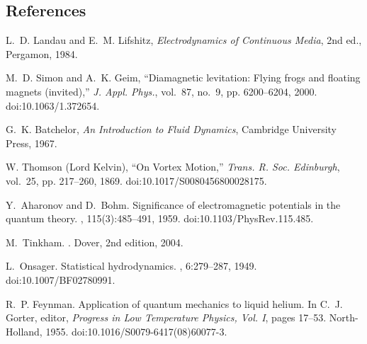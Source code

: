 \documentclass[11pt,a4paper]{article}
\begin{document}
\subsection*{References}
\begin{thebibliography}{9}
	L.~D. Landau and E.~M. Lifshitz,
	\newblock \emph{Electrodynamics of Continuous Media}, 2nd ed.,
	Pergamon, 1984.

	M.~D. Simon and A.~K. Geim,
	``Diamagnetic levitation: Flying frogs and floating magnets (invited),''
	\emph{J. Appl. Phys.}, vol.~87, no.~9, pp. 6200--6204, 2000.
	doi:10.1063/1.372654.

	G.~K. Batchelor,
	\newblock \emph{An Introduction to Fluid Dynamics},
	Cambridge University Press, 1967.

	W. Thomson (Lord Kelvin),
	``On Vortex Motion,''
	\emph{Trans. R. Soc. Edinburgh}, vol.~25, pp. 217--260, 1869.
	doi:10.1017/S0080456800028175.
\end{thebibliography}


\begin{thebibliography}{10}

Y.~Aharonov and D.~Bohm.
\newblock Significance of electromagnetic potentials in the quantum theory.
, 115(3):485--491, 1959.
\newblock doi:10.1103/PhysRev.115.485.

M.~Tinkham.
.
\newblock Dover, 2nd edition, 2004.

L.~Onsager.
\newblock Statistical hydrodynamics.
, 6:279--287, 1949.
\newblock doi:10.1007/BF02780991.

R.~P. Feynman.
\newblock Application of quantum mechanics to liquid helium.
\newblock In C.~J. Gorter, editor, {\em Progress in Low Temperature Physics, Vol. I}, pages 17--53. North-Holland, 1955.
\newblock doi:10.1016/S0079-6417(08)60077-3.

\end{thebibliography}
\end{document}

